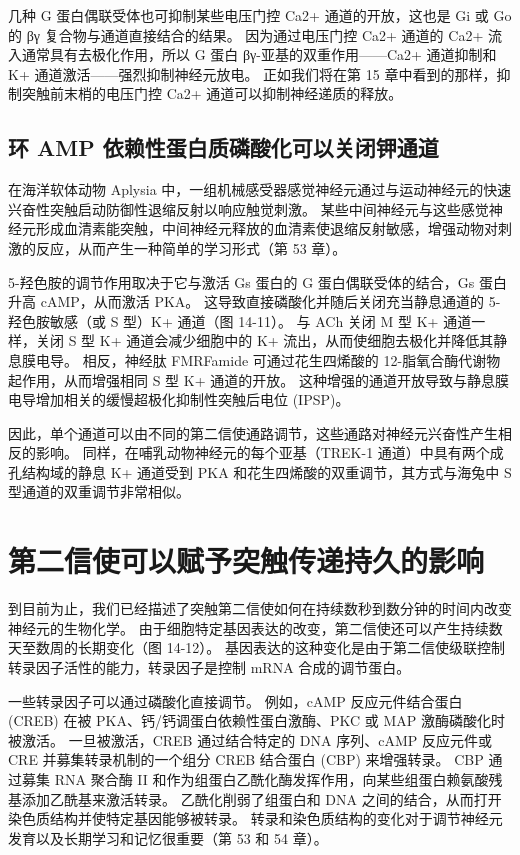 几种 G 蛋白偶联受体也可抑制某些电压门控 Ca2+ 通道的开放，这也是 Gi 或 Go 的 βγ 复合物与通道直接结合的结果。 因为通过电压门控 Ca2+ 通道的 Ca2+ 流入通常具有去极化作用，所以 G 蛋白 βγ-亚基的双重作用——Ca2+ 通道抑制和 K+ 通道激活——强烈抑制神经元放电。 正如我们将在第 15 章中看到的那样，抑制突触前末梢的电压门控 Ca2+ 通道可以抑制神经递质的释放。

\subsection{环 AMP 依赖性蛋白质磷酸化可以关闭钾通道}

在海洋软体动物 Aplysia 中，一组机械感受器感觉神经元通过与运动神经元的快速兴奋性突触启动防御性退缩反射以响应触觉刺激。 某些中间神经元与这些感觉神经元形成血清素能突触，中间神经元释放的血清素使退缩反射敏感，增强动物对刺激的反应，从而产生一种简单的学习形式（第 53 章）。

5-羟色胺的调节作用取决于它与激活 Gs 蛋白的 G 蛋白偶联受体的结合，Gs 蛋白升高 cAMP，从而激活 PKA。 这导致直接磷酸化并随后关闭充当静息通道的 5-羟色胺敏感（或 S 型）K+ 通道（图 14-11）。 与 ACh 关闭 M 型 K+ 通道一样，关闭 S 型 K+ 通道会减少细胞中的 K+ 流出，从而使细胞去极化并降低其静息膜电导。 相反，神经肽 FMRFamide 可通过花生四烯酸的 12-脂氧合酶代谢物起作用，从而增强相同 S 型 K+ 通道的开放。 这种增强的通道开放导致与静息膜电导增加相关的缓慢超极化抑制性突触后电位 (IPSP)。

因此，单个通道可以由不同的第二信使通路调节，这些通路对神经元兴奋性产生相反的影响。 同样，在哺乳动物神经元的每个亚基（TREK-1 通道）中具有两个成孔结构域的静息 K+ 通道受到 PKA 和花生四烯酸的双重调节，其方式与海兔中 S 型通道的双重调节非常相似。

\section{第二信使可以赋予突触传递持久的影响}

到目前为止，我们已经描述了突触第二信使如何在持续数秒到数分钟的时间内改变神经元的生物化学。 由于细胞特定基因表达的改变，第二信使还可以产生持续数天至数周的长期变化（图 14-12）。 基因表达的这种变化是由于第二信使级联控制转录因子活性的能力，转录因子是控制 mRNA 合成的调节蛋白。

一些转录因子可以通过磷酸化直接调节。 例如，cAMP 反应元件结合蛋白 (CREB) 在被 PKA、钙/钙调蛋白依赖性蛋白激酶、PKC 或 MAP 激酶磷酸化时被激活。 一旦被激活，CREB 通过结合特定的 DNA 序列、cAMP 反应元件或 CRE 并募集转录机制的一个组分 CREB 结合蛋白 (CBP) 来增强转录。 CBP 通过募集 RNA 聚合酶 II 和作为组蛋白乙酰化酶发挥作用，向某些组蛋白赖氨酸残基添加乙酰基来激活转录。 乙酰化削弱了组蛋白和 DNA 之间的结合，从而打开染色质结构并使特定基因能够被转录。 转录和染色质结构的变化对于调节神经元发育以及长期学习和记忆很重要（第 53 和 54 章）。

